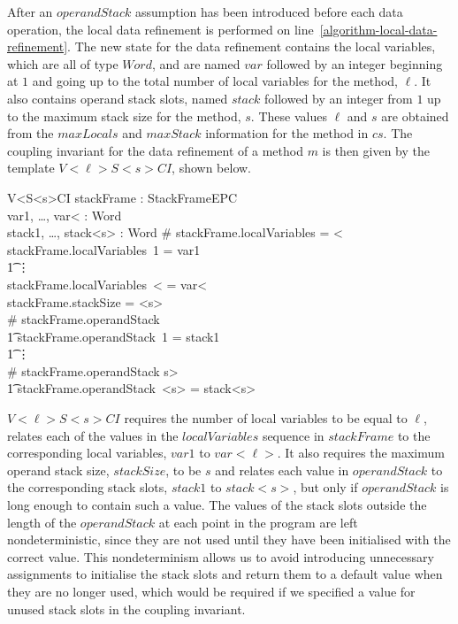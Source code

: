 After an $operandStack$ assumption has been introduced before each
data operation, the local data refinement is performed on
line~\ref{algorithm-local-data-refinement}.
The new state for the data refinement contains the local variables,
which are all of type $Word$, and are named $var$ followed by an
integer beginning at $1$ and going up to the total number of local
variables for the method, $\ell$.
It also contains operand stack slots, named $stack$ followed by an
integer from $1$ up to the maximum stack size for the method, $s$.
These values $\ell$ and $s$ are obtained from the $maxLocals$ and
$maxStack$ information for the method in $cs$.
The coupling invariant for the data refinement of a method $m$ is then
given by the template $V{<}\ell{>}S{<}s{>}CI$, shown below.

\begin{schema}{V{<}\ell{>}S{<}s{>}CI}
  stackFrame : StackFrameEPC \\
  var1, \ldots, var{<}\ell{>} : Word \\
  stack1, \ldots, stack{<}s{>} : Word
\where
  \# stackFrame.localVariables = {<}\ell{>} \\
  stackFrame.localVariables~1 = var1 \\
  \t1 \vdots \\
  stackFrame.localVariables~{<}\ell{>} = var{<}\ell{>} \\
  stackFrame.stackSize = {<}s{>} \\
  \# stackFrame.operandStack  \implies \\
  \t1 stackFrame.operandStack~1 = stack1 \\
  \t1 \vdots \\
  \# stackFrame.operandStack \geq {<}s{>} \implies \\
  \t1 stackFrame.operandStack~{<}s{>} = stack{<}s{>}
\end{schema}

$V{<}\ell{>}S{<}s{>}CI$ requires the number of local variables to be
equal to $\ell$, relates each of the values in the $localVariables$
sequence in $stackFrame$ to the corresponding local variables, $var1$
to $var{<}\ell{>}$.
It also requires the maximum operand stack size, $stackSize$, to be
$s$ and relates each value in $operandStack$ to the corresponding
stack slots, $stack1$ to $stack{<}s{>}$, but only if $operandStack$ is
long enough to contain such a value.
The values of the stack slots outside the length of the $operandStack$
at each point in the program are left nondeterministic, since they are
not used until they have been initialised with the correct value.
This nondeterminism allows us to avoid introducing unnecessary
assignments to initialise the stack slots and return them to a default
value when they are no longer used, which would be required if we
specified a value for unused stack slots in the coupling invariant.


